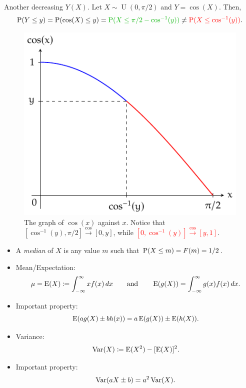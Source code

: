 \begin{example}{Another decreasing \(Y(X)\).}
  Let \(X\sim\operatorname{U}(0,\pi/2)\) and \(Y=\cos(X)\). Then, 
  \[\Prob(Y\leq y)=\Prob(\cos(X)\leq y)=\textcolor{green!70!black}{\Prob(X\leq\pi/2-\cos^{-1}(y))}\neq \textcolor{red}{\Prob(X\leq\cos^{-1}(y))}.\]
  \begin{figure}[H]
    \centering
    \includegraphics{Diagrams/CRV-cosine/diagram.pdf}
    \caption{The graph of \(\cos(x)\) against \(x\). Notice that \textcolor{green!70!black}{\([\cos^{-1}(y),\pi/2]\stackrel{\cos}{\to}[0,y]\)}, while \textcolor{red}{\([0,\cos^{-1}(y)]\stackrel{\cos}{\to}[y,1]\)}.}
    \label{fig:CRV-cosine}
  \end{figure}
\end{example}
\begin{stbox}{}
  \begin{itemize}
    \item A \emph{median} of \(X\) is any value \(m\) such that \(\operatorname{P}(X\leq m)=F(m)=1/2\).
    \item Mean/Expectation: 
    \[\mu=\operatorname{E}(X)\coloneq \int_{-\infty}^{\infty}xf(x)\,dx \qquad\text{and}\qquad \operatorname{E}(g(X))=\int_{-\infty}^{\infty}g(x)f(x)\,dx.\]
    \item Important property: 
    \[\operatorname{E}(ag(X)\pm bh(x))=a\operatorname{E}(g(X))\pm\operatorname{E}(h(X)).\]
    \item Variance: 
    \[\operatorname{Var}(X)\coloneq \operatorname{E}(X^2)-[\operatorname{E}(X)]^2.\]
    \item Important property:
    \[\operatorname{Var}(aX\pm b)=a^2\operatorname{Var}(X).\]
  \end{itemize}
\end{stbox}